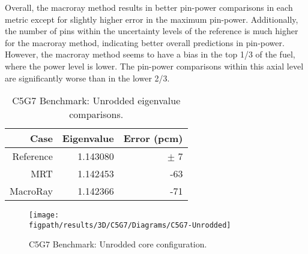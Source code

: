 {{{{        Overall, the macroray method results in better pin-power comparisons in each metric except for slightly higher error in the maximum pin-power.
        Additionally, the number of pins within the uncertainty levels of the reference is much higher for the macroray method, indicating better overall predictions in pin-power.
        However, the macroray method seems to have a bias in the top 1/3 of the fuel, where the power level is lower.
        The pin-power comparisons within this axial level are significantly worse than in the lower 2/3.

        \begin{table}[htbp]
          \centering
          \caption{C5G7 Benchmark: Unrodded eigenvalue comparisons. \label{tab:MR:C5G7:Unrodded-Eigenvalues}}
          \begin{tabular}{rrr}\toprule
            Case & Eigenvalue & Error (pcm)\\\midrule
            Reference & 1.143080 & $\pm$ 7\\
            MRT       & 1.142453 & -63\\
            MacroRay  & 1.142366 & -71\\\bottomrule
          \end{tabular}
        \end{table}

        \begin{figure}[htbp]
          \centering
          \texttt{[image: \\figpath/results/3D/C5G7/Diagrams/C5G7-Unrodded]}
          \caption{C5G7 Benchmark: Unrodded core configuration. \label{fig:MR:C5G7:Unrodded}}
        \end{figure}

}}}}
